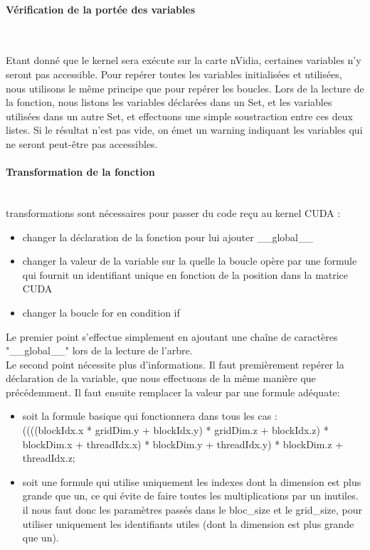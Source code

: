 \documentclass{article}
\begin{document}
	
	\paragraph{Vérification de la portée des variables}
	~~\\
	\indent

	Etant donné que le kernel sera exécute sur la carte nVidia, certaines variables n'y seront pas accessible. Pour repérer toutes les variables initialisées et utilisées, nous utilisons le même principe que pour repérer les boucles. Lors de la lecture de la fonction, nous listons les variables déclarées dans un Set, et les variables utilisées dans un autre Set, et effectuons une simple soustraction entre ces deux listes. Si le résultat n'est pas vide, on émet un warning indiquant les variables qui ne seront peut-être pas accessibles.
	
	\paragraph{Transformation de la fonction}
	~~\\
	 transformations sont nécessaires pour passer du code reçu au kernel CUDA :
	\begin{itemize}
		\item changer la déclaration de la fonction pour lui ajouter \_\_global\_\_
		\item changer la valeur de la variable sur la quelle la boucle opère par une formule qui fournit un identifiant unique en fonction de la position dans la matrice CUDA
		\item changer la boucle for en condition if
	\end{itemize}
	Le premier point s'effectue simplement en ajoutant une chaîne de caractères "\_\_global\_\_" lors de la lecture de l'arbre.
	\\Le second point nécessite plus d'informations. Il faut premièrement repérer la déclaration de la variable, que nous effectuons de la même manière que précédemment. Il faut ensuite remplacer la valeur par une formule adéquate:
	\begin{itemize}
	\item soit la formule basique qui fonctionnera dans tous les cas : 
	\\ ((((blockIdx.x * gridDim.y + blockIdx.y) * gridDim.z + blockIdx.z) * blockDim.x + threadIdx.x) * blockDim.y + threadIdx.y) * blockDim.z + threadIdx.z;
	\item soit une formule qui utilise uniquement les indexes dont la dimension est plus grande que un, ce qui évite de faire toutes les multiplications par un inutiles. il nous faut donc les paramètres passés dans le bloc\_size et le grid\_size, pour utiliser uniquement les identifiants utiles (dont la dimension est plus grande que un).
	\end{itemize}
	
\end{document}
